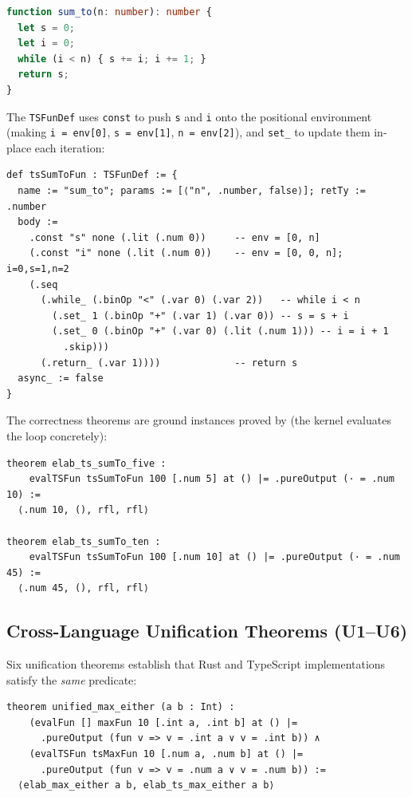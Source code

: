 \begin{lstlisting}[language=TypeScript,caption={TypeScript sum\_to source.},label={lst:tssumto}]
function sum_to(n: number): number {
  let s = 0;
  let i = 0;
  while (i < n) { s += i; i += 1; }
  return s;
}
\end{lstlisting}

The \texttt{TSFunDef} uses \texttt{const} to push \texttt{s} and \texttt{i}
onto the positional environment (making \texttt{i = env[0]},
\texttt{s = env[1]}, \texttt{n = env[2]}), and \texttt{set\_} to update
them in-place each iteration:

\begin{lstlisting}[caption={T14: tsSumToFun definition.},label={lst:tssumtofun}]
def tsSumToFun : TSFunDef := {
  name := "sum_to"; params := [⟨"n", .number, false⟩]; retTy := .number
  body :=
    .const "s" none (.lit (.num 0))     -- env = [0, n]
    (.const "i" none (.lit (.num 0))    -- env = [0, 0, n]; i=0,s=1,n=2
    (.seq
      (.while_ (.binOp "<" (.var 0) (.var 2))   -- while i < n
        (.set_ 1 (.binOp "+" (.var 1) (.var 0)) -- s = s + i
        (.set_ 0 (.binOp "+" (.var 0) (.lit (.num 1))) -- i = i + 1
          .skip)))
      (.return_ (.var 1))))             -- return s
  async_ := false
}
\end{lstlisting}

The correctness theorems are ground instances proved by \rfl (the kernel
evaluates the loop concretely):

\begin{lstlisting}[caption={T14 ground instances.},label={lst:tssumtothm}]
theorem elab_ts_sumTo_five :
    evalTSFun tsSumToFun 100 [.num 5] at () |= .pureOutput (· = .num 10) :=
  ⟨.num 10, (), rfl, rfl⟩

theorem elab_ts_sumTo_ten :
    evalTSFun tsSumToFun 100 [.num 10] at () |= .pureOutput (· = .num 45) :=
  ⟨.num 45, (), rfl, rfl⟩
\end{lstlisting}

\subsection{Cross-Language Unification Theorems (U1--U6)}
\label{sec:unification}

Six unification theorems establish that Rust and TypeScript implementations
satisfy the \emph{same} \ProgramSpec predicate:

\begin{lstlisting}[caption={U1: max — same spec from both languages.},
                   label={lst:unified}]
theorem unified_max_either (a b : Int) :
    (evalFun [] maxFun 10 [.int a, .int b] at () |=
      .pureOutput (fun v => v = .int a ∨ v = .int b)) ∧
    (evalTSFun tsMaxFun 10 [.num a, .num b] at () |=
      .pureOutput (fun v => v = .num a ∨ v = .num b)) :=
  ⟨elab_max_either a b, elab_ts_max_either a b⟩
\end{lstlisting}

